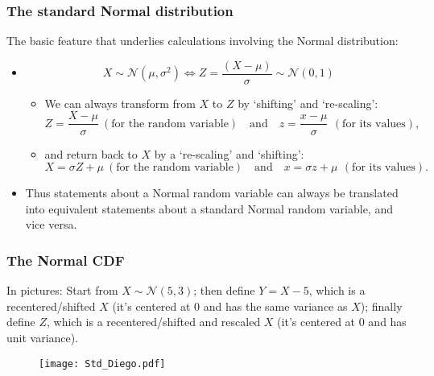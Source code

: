 \documentclass[notes=show,smaller,handout]{beamer}\usepackage[]{graphicx}\usepackage[]{color}
\newcommand{\N}{\mathcal{N}}
\newenvironment{stepitemize}{\begin{itemize}[<+->]}{\end{itemize} }
\begin{document}
\begin{frame}%

\frametitle{The standard Normal distribution}

The basic feature that underlies calculations involving the Normal distribution:
\begin{stepitemize}
\item $$X\sim \N\left( \mu ,\sigma ^{2}\right)\Leftrightarrow Z=\frac{\left( X-\mu \right) }{\sigma }\sim \N\left( 0,1\right)$$
\begin{stepitemize}
\item We can always transform from $X$ to $Z$  by  `shifting' and `re-scaling':%
\begin{equation*}
Z=\frac{X-\mu }{\sigma } \ (\text{for the random variable}) \quad\mbox{and}\quad z=\frac{x-\mu }{\sigma }\,  \ (\text{for its values}) ,
\end{equation*}
\item and return back to $X$ by a `re-scaling' and `shifting':%
\begin{equation*}
X=\sigma Z+\mu  \ (\text{for the random variable}) \quad\mbox{and}\quad x=\sigma z+\mu\, \ (\text{for its values}) .
\end{equation*}
\end{stepitemize}
\item Thus statements about a Normal random variable can always be translated into equivalent statements about a standard Normal random variable, and vice versa.
\end{stepitemize}

\end{frame}%


\begin{frame}%

\frametitle{The Normal CDF}
In pictures:
Start from $X \sim \mathcal{N}(5,3)$; then define $Y=X-5$, which is a recentered/shifted $X$ (it's centered at 0 and has the same variance as $X$); finally define $Z$, which is a recentered/shifted and rescaled $X$ (it's centered at 0 and has unit variance).

\begin{figure}[ptb]\centering
\texttt{[image: Std\_Diego.pdf]}%
\end{figure}%



\end{frame}
\end{document}
